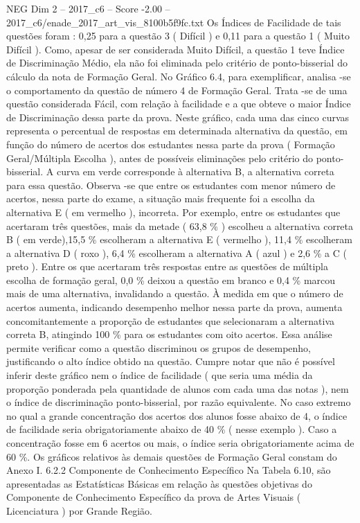 \begin{textsample}{NEG Dim 2 – 2017\_c6 – Score -2.00 – 2017\_c6/enade\_2017\_art\_vis\_8100b5f9fc.txt}
Os Índices de Facilidade de tais questões foram : 0,25 para a questão 3 ( Difícil ) e 0,11 para a questão 1 ( Muito Difícil ).
Como, apesar de ser considerada Muito Difícil, a questão 1 teve Índice de Discriminação Médio, ela não foi eliminada pelo critério de ponto-bisserial do cálculo da nota de Formação Geral.
No Gráfico 6.4, para exemplificar, analisa -se o comportamento da questão de número 4 de Formação Geral.
Trata -se de uma questão considerada Fácil, com relação à facilidade e a que obteve o maior Índice de Discriminação dessa parte da prova.
Neste gráfico, cada uma das cinco curvas representa o percentual de respostas em determinada alternativa da questão, em função do número de acertos dos estudantes nessa parte da prova ( Formação Geral/Múltipla Escolha ), antes de possíveis eliminações pelo critério do ponto-bisserial.
A curva em verde corresponde à alternativa B, a alternativa correta para essa questão.
Observa -se que entre os estudantes com menor número de acertos, nessa parte do exame, a situação mais frequente foi a escolha da alternativa E ( em vermelho ), incorreta.
Por exemplo, entre os estudantes que acertaram três questões, mais da metade ( 63,8 \% ) escolheu a alternativa correta B ( em verde),15,5 \% escolheram a alternativa E ( vermelho ), 11,4 \% escolheram a alternativa D ( roxo ), 6,4 \% escolheram a alternativa A ( azul ) e 2,6 \% a C ( preto ).
Entre os que acertaram três respostas entre as questões de múltipla escolha de formação geral, 0,0 \% deixou a questão em branco e 0,4 \% marcou mais de uma alternativa, invalidando a questão.
À medida em que o número de acertos aumenta, indicando desempenho melhor nessa parte da prova, aumenta concomitantemente a proporção de estudantes que selecionaram a alternativa correta B, atingindo 100 \% para os estudantes com oito acertos.
Essa análise permite verificar como a questão discriminou os grupos de desempenho, justificando o alto índice obtido na questão.
Cumpre notar que não é possível inferir deste gráfico nem o índice de facilidade ( que seria uma média da proporção ponderada pela quantidade de alunos com cada uma das notas ), nem o índice de discriminação ponto-bisserial, por razão equivalente.
No caso extremo no qual a grande concentração dos acertos dos alunos fosse abaixo de 4, o índice de facilidade seria obrigatoriamente abaixo de 40 \% ( nesse exemplo ).
Caso a concentração fosse em 6 acertos ou mais, o índice seria obrigatoriamente acima de 60 \%.
Os gráficos relativos às demais questões de Formação Geral constam do Anexo I. 6.2.2 Componente de Conhecimento Específico Na Tabela 6.10, são apresentadas as Estatísticas Básicas em relação às questões objetivas do Componente de Conhecimento Específico da prova de Artes Visuais ( Licenciatura ) por Grande Região.

\end{textsample}
